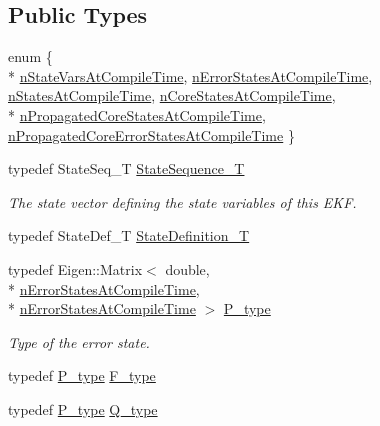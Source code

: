 \subsection*{Public Types}
\begin{DoxyCompactItemize}
\item 
enum \{ \\*
\hyperlink{structmsf__core_1_1GenericState__T_a20545d9aacd8f84bc1a97a873310cd5fabae0f6113b2fd3bd1e55a7fd0a3e8534}{n\-State\-Vars\-At\-Compile\-Time}, 
\hyperlink{structmsf__core_1_1GenericState__T_a20545d9aacd8f84bc1a97a873310cd5fab0136c5805e4e8d75677885fcaad5901}{n\-Error\-States\-At\-Compile\-Time}, 
\hyperlink{structmsf__core_1_1GenericState__T_a20545d9aacd8f84bc1a97a873310cd5faf75f7ae9223cdbc573d043e82f5843bd}{n\-States\-At\-Compile\-Time}, 
\hyperlink{structmsf__core_1_1GenericState__T_a20545d9aacd8f84bc1a97a873310cd5fabd9ce322dcc236ba424c7435e37a34f3}{n\-Core\-States\-At\-Compile\-Time}, 
\\*
\hyperlink{structmsf__core_1_1GenericState__T_a20545d9aacd8f84bc1a97a873310cd5fa20a7211e99e3848fc20fce6cd9834c91}{n\-Propagated\-Core\-States\-At\-Compile\-Time}, 
\hyperlink{structmsf__core_1_1GenericState__T_a20545d9aacd8f84bc1a97a873310cd5faa076b31f0a4176856a0ddc0556801725}{n\-Propagated\-Core\-Error\-States\-At\-Compile\-Time}
 \}
\item 
typedef State\-Seq\-\_\-\-T \hyperlink{structmsf__core_1_1GenericState__T_a75fe70f7c7517dbf7d4c91b75b08a1dd}{State\-Sequence\-\_\-\-T}
\begin{DoxyCompactList}\small\item\em The state vector defining the state variables of this E\-K\-F. \end{DoxyCompactList}\item 
typedef State\-Def\-\_\-\-T \hyperlink{structmsf__core_1_1GenericState__T_a9a7d65b0325658ab07b81960a3ed4604}{State\-Definition\-\_\-\-T}
\item 
typedef Eigen\-::\-Matrix$<$ double, \\*
\hyperlink{structmsf__core_1_1GenericState__T_a20545d9aacd8f84bc1a97a873310cd5fab0136c5805e4e8d75677885fcaad5901}{n\-Error\-States\-At\-Compile\-Time}, \\*
\hyperlink{structmsf__core_1_1GenericState__T_a20545d9aacd8f84bc1a97a873310cd5fab0136c5805e4e8d75677885fcaad5901}{n\-Error\-States\-At\-Compile\-Time} $>$ \hyperlink{structmsf__core_1_1GenericState__T_ab6d971027f43219a480e910392b665c8}{P\-\_\-type}
\begin{DoxyCompactList}\small\item\em Type of the error state. \end{DoxyCompactList}\item 
typedef \hyperlink{structmsf__core_1_1GenericState__T_ab6d971027f43219a480e910392b665c8}{P\-\_\-type} \hyperlink{structmsf__core_1_1GenericState__T_a9b665561d9157530cc72dab33ed0344f}{F\-\_\-type}
\item 
typedef \hyperlink{structmsf__core_1_1GenericState__T_ab6d971027f43219a480e910392b665c8}{P\-\_\-type} \hyperlink{structmsf__core_1_1GenericState__T_a2bd29a1ae1d6a6115a4dda70e285dc28}{Q\-\_\-type}
\end{DoxyCompactItemize}
